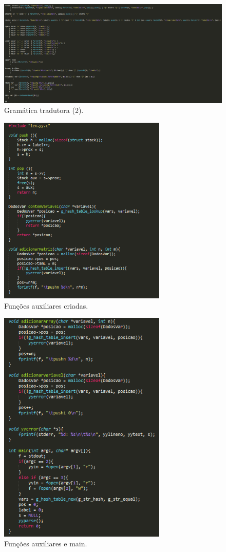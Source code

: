 \documentclass{report}
\begin{document}
\begin{figure}[ht]
\centering
\includegraphics[width=180mm, scale=0.9]{gt3.PNG}
\caption{\label{fig:change}Gramática tradutora (2).}
\end{figure}

\begin{figure}[ht]
\centering
\includegraphics[width=80mm, scale=0.5]{gt4.png}
\caption{\label{fig:change}Funções auxiliares criadas.}
\end{figure}

\begin{figure}[ht]
\centering
\includegraphics[width=80mm, scale=0.5]{gt5.png}
\caption{\label{fig:change}Funções auxiliares e main.}
\end{figure}
\end{document}
